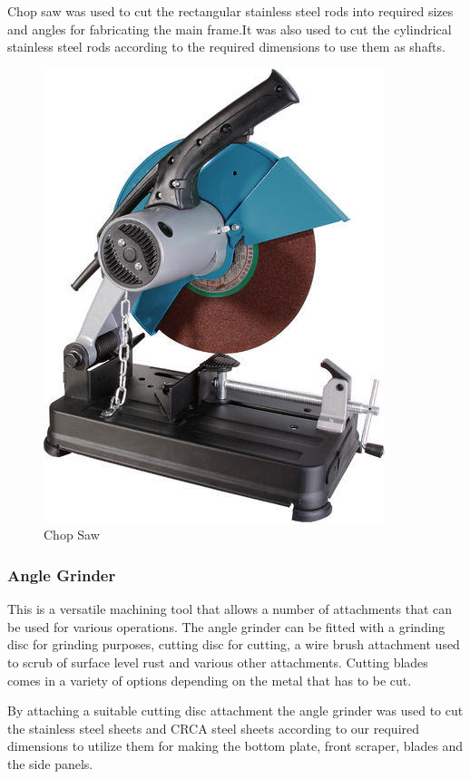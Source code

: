 Chop saw was used to cut the rectangular stainless steel rods into required sizes and angles for fabricating the main frame.It was also used to cut the cylindrical stainless steel rods according to the required dimensions to use them as shafts. 

\begin{figure}[h!]
    \centering
    \includegraphics{chopsaw.jpg}
    \caption{Chop Saw}
    \label{fig:Chop Saw}
\end{figure}

\subsubsection{Angle Grinder} \label{Angle Grinder}
This is a versatile machining tool that allows a number of attachments that can be used for various operations. The angle grinder can be fitted with a grinding disc for grinding purposes, cutting disc for cutting, a wire brush attachment used to scrub of surface level rust and various other attachments. Cutting blades comes in a variety of options depending on the metal that has to be cut.

By attaching a suitable cutting disc attachment the angle grinder was used to cut the stainless steel sheets and CRCA steel sheets according to our required dimensions to utilize them for making the bottom plate, front scraper, blades and the side panels.

